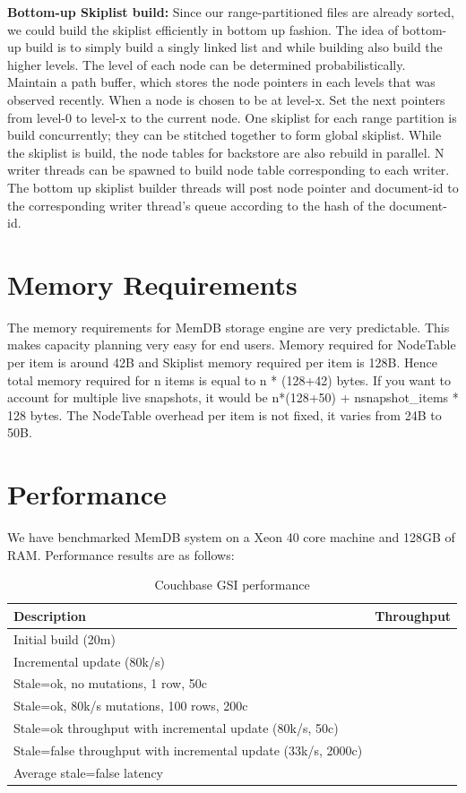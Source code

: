 \documentclass{vldb}
\begin{document}
\textbf{Bottom-up Skiplist build:} Since our range-partitioned files are already sorted, we could build the skiplist efficiently in bottom up fashion. The idea of bottom-up build is to simply build a singly linked list and while building also build the higher levels. The level of each node can be determined probabilistically. Maintain a path buffer, which stores the node pointers in each levels that was observed recently. When a node is chosen to be at level-x. Set the next pointers from level-0 to level-x to the current node. One skiplist for each range partition is build concurrently; they can be stitched together to form global skiplist.
    While the skiplist is build, the node tables for backstore are also rebuild in parallel. N writer threads can be spawned to build node table corresponding to each writer. The bottom up skiplist builder threads will post node pointer and document-id to the corresponding writer thread’s queue according to the hash of the document-id.

\section{Memory Requirements}
The memory requirements for MemDB storage engine are very predictable. This makes capacity planning very easy for end users. Memory required for NodeTable per item is around 42B and Skiplist memory required per item is 128B. Hence total memory required for n items is equal to n * (128+42) bytes. If you want to account for multiple live snapshots, it would be n*(128+50) + nsnapshot\_items * 128 bytes. The NodeTable overhead per item is not fixed, it varies from 24B to 50B.

\section{Performance}
We have benchmarked MemDB system on a Xeon 40 core machine and 128GB of RAM. Performance results are as follows:

\FloatBarrier
\begin{table}[h]
\caption{Couchbase GSI performance}
\begin{tabularx}{\linewidth}{|X|l|} \hline
Description&Throughput\\ \hline
Initial build (20m)& \\ \hline
Incremental update (80k/s)& \\ \hline
Stale=ok, no mutations, 1 row, 50c& \\ \hline
Stale=ok, 80k/s mutations, 100 rows, 200c& \\ \hline
Stale=ok throughput with incremental update (80k/s, 50c)& \\ \hline
Stale=false throughput with incremental update (33k/s, 2000c)& \\ \hline
Average stale=false latency& \\ \hline
\hline\end{tabularx}
\end{table}
\FloatBarrier
\end{document}

